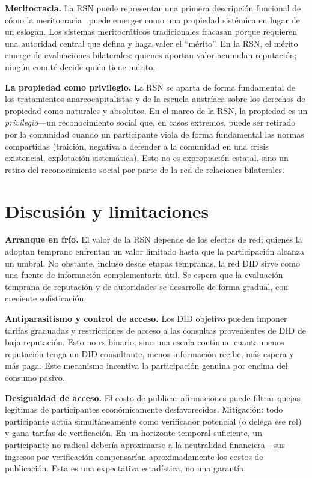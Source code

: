 \documentclass[11pt,a4paper,twocolumn]{article}
\begin{document}
\textbf{Meritocracia.} La RSN puede representar una primera descripción funcional de cómo la meritocracia~\cite{young1958} puede emerger como una propiedad sistémica en lugar de un eslogan. Los sistemas meritocráticos tradicionales fracasan porque requieren una autoridad central que defina y haga valer el ``mérito''. En la RSN, el mérito emerge de evaluaciones bilaterales: quienes aportan valor acumulan reputación; ningún comité decide quién tiene mérito.

\textbf{La propiedad como privilegio.} La RSN se aparta de forma fundamental de los tratamientos anarcocapitalistas y de la escuela austríaca sobre los derechos de propiedad como naturales y absolutos. En el marco de la RSN, la propiedad es un \emph{privilegio}---un reconocimiento social que, en casos extremos, puede ser retirado por la comunidad cuando un participante viola de forma fundamental las normas compartidas (traición, negativa a defender a la comunidad en una crisis existencial, explotación sistemática). Esto no es expropiación estatal, sino un retiro del reconocimiento social por parte de la red de relaciones bilaterales.

\section{Discusión y limitaciones}

\textbf{Arranque en frío.} El valor de la RSN depende de los efectos de red; quienes la adoptan temprano enfrentan un valor limitado hasta que la participación alcanza un umbral. No obstante, incluso desde etapas tempranas, la red DID sirve como una fuente de información complementaria útil. Se espera que la evaluación temprana de reputación y de autoridades se desarrolle de forma gradual, con creciente sofisticación.

\textbf{Antiparasitismo y control de acceso.} Los DID objetivo pueden imponer tarifas graduadas y restricciones de acceso a las consultas provenientes de DID de baja reputación. Esto no es binario, sino una escala continua: cuanta menos reputación tenga un DID consultante, menos información recibe, más espera y más paga. Este mecanismo incentiva la participación genuina por encima del consumo pasivo.

\textbf{Desigualdad de acceso.} El costo de publicar afirmaciones puede filtrar quejas legítimas de participantes económicamente desfavorecidos. Mitigación: todo participante actúa simultáneamente como verificador potencial (o delega ese rol) y gana tarifas de verificación. En un horizonte temporal suficiente, un participante no radical debería aproximarse a la neutralidad financiera---sus ingresos por verificación compensarían aproximadamente los costos de publicación. Esta es una expectativa estadística, no una garantía.
\end{document}

